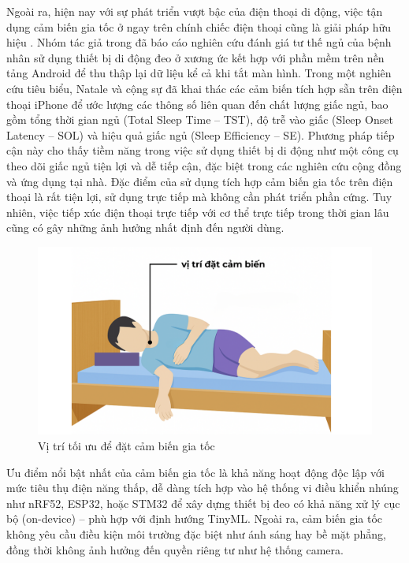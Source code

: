 Ngoài ra, hiện nay với sự phát triển vượt bậc của điện thoại di động, 
việc tận dụng cảm biến gia tốc 
ở ngay trên chính chiếc điện thoại cũng là giải pháp hữu hiệu \cite{sun2017sleepmonitor}. 
Nhóm tác giả trong \cite{Ferrer_osa} đã báo cáo nghiên cứu đánh giá tư thế ngủ 
của bệnh nhân sử dụng thiết bị di động đeo ở xương ức kết hợp với 
phần mềm trên nền tảng Android để thu thập lại dữ liệu kể cả khi tắt màn hình. 
Trong một nghiên cứu tiêu biểu, Natale và cộng sự đã khai thác các cảm biến tích 
hợp sẵn trên điện thoại iPhone để ước lượng các thông số liên 
quan đến chất lượng giấc ngủ, bao gồm tổng thời gian ngủ (Total Sleep Time – TST), 
độ trễ vào giấc (Sleep Onset Latency – SOL) và hiệu quả giấc ngủ (Sleep Efficiency – SE). 
Phương pháp tiếp cận này cho thấy tiềm năng trong việc sử dụng thiết bị di động 
như một công cụ theo dõi giấc ngủ tiện lợi và dễ tiếp cận, đặc biệt trong các nghiên 
cứu cộng đồng và ứng dụng tại nhà\cite{Natale_osa}. Đặc điểm của sử dụng tích hợp cảm biến gia tốc 
trên điện thoại là rất tiện lợi, sử dụng trực tiếp mà không cần phát triển phần cứng. 
Tuy nhiên, việc tiếp xúc điện thoại trực tiếp với cơ thể trực tiếp trong thời gian 
lâu cũng có gây những ảnh hưởng nhất định đến người dùng.

\begin{figure}[!ht]
		\centering
 		\includegraphics[width=\textwidth]{images/vị trí đặt cảm biến.png}
 		\vspace*{-7mm}
		\caption{Vị trí tối ưu để đặt cảm biến gia tốc}
		\label{position_sensor}
\end{figure}

Ưu điểm nổi bật nhất của cảm biến gia tốc là khả năng hoạt động độc lập 
với mức tiêu thụ điện năng thấp, dễ dàng tích hợp vào hệ thống vi điều 
khiển nhúng như nRF52, ESP32, hoặc STM32 để xây dựng thiết bị đeo có khả 
năng xử lý cục bộ (on-device) – phù hợp với định hướng TinyML. 
Ngoài ra, cảm biến gia tốc không yêu cầu điều kiện môi trường đặc 
biệt như ánh sáng hay bề mặt phẳng, đồng thời không ảnh hưởng đến 
quyền riêng tư như hệ thống camera.


